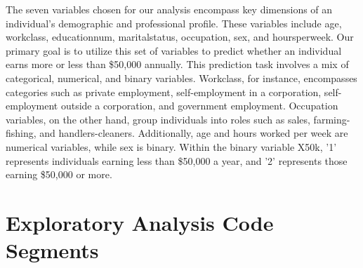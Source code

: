 \documentclass{article}
\begin{document}
The seven variables chosen for our analysis encompass key dimensions of an individual's demographic and professional profile. These variables include age, workclass, educationnum, maritalstatus, occupation, sex, and hoursperweek. Our primary goal is to utilize this set of variables to predict whether an individual earns more or less than \$50,000 annually. This prediction task involves a mix of categorical, numerical, and binary variables. Workclass, for instance, encompasses categories such as private employment, self-employment in a corporation, self-employment outside a corporation, and government employment. Occupation variables, on the other hand, group individuals into roles such as sales, farming-fishing, and handlers-cleaners. Additionally, age and hours worked per week are numerical variables, while sex is binary. Within the binary variable X50k, '1' represents individuals earning less than \$50,000 a year, and '2' represents those earning \$50,000 or more.
\appendix 

\section{Exploratory Analysis Code Segments}
\end{document}
